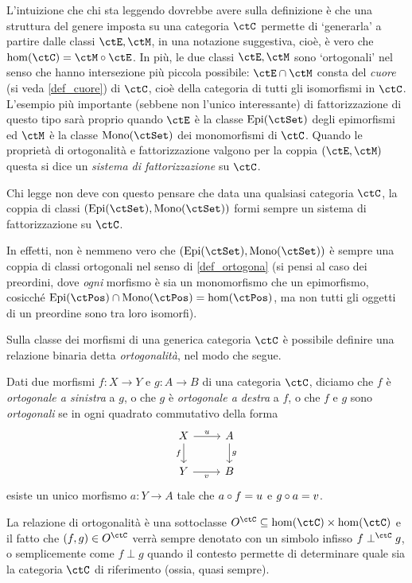L'intuizione che chi sta leggendo dovrebbe avere sulla definizione è che una struttura del genere imposta su una categoria \(\ctC\) permette di `generarla' a partire dalle classi \(\ctE,\ctM\), in una notazione suggestiva, cioè, è vero che \(\hom(\ctC) = \ctM\cmp \ctE\). In più, le due classi \(\ctE,\ctM\) sono `ortogonali' nel senso che hanno intersezione più piccola possibile: \(\ctE\cap \ctM\) consta del \emph{cuore} (si veda \ref{def_cuore}) di \(\ctC\), cioè della categoria di tutti gli isomorfismi in \(\ctC\).
\color{red}
L'esempio più importante (sebbene non l'unico interessante) di fattorizzazione di questo tipo sarà proprio quando \(\ctE\) è la classe \(\Epi\) degli epimorfismi ed \(\ctM\) è la classe \(\Mono\) dei monomorfismi di \(\ctC\). Quando le proprietà di ortogonalità e fattorizzazione valgono per la coppia \((\ctE,\ctM)\) questa si dice un \emph{sistema di fattorizzazione} su \(\ctC\).
\begin{remark}
	Chi legge non deve con questo pensare che data una qualsiasi categoria \(\ctC\), la coppia di classi \((\Epi,\Mono)\) formi sempre un sistema di fattorizzazione su \(\ctC\).

	In effetti, non è nemmeno vero che \((\Epi,\Mono)\) è sempre una coppia di classi ortogonali nel senso di \ref{def_ortogona} (si pensi al caso dei preordini, dove \emph{ogni} morfismo è sia un monomorfismo che un epimorfismo, cosicché \(\Epi[\ctPos]\cap\Mono[\ctPos]=\hom(\ctPos)\), ma non tutti gli oggetti di un preordine sono tra loro isomorfi).
\end{remark}
\color{black}
Sulla classe dei morfismi di una generica categoria \(\ctC\) è possibile definire una relazione binaria detta \emph{ortogonalità}, nel modo che segue.
\begin{definition}\label{def_ortogona}
	Dati due morfismi \(f : X\to Y\) e \(g : A\to B\) di una categoria \(\ctC\), diciamo che \(f\) è \emph{ortogonale a sinistra} a \(g\), o che \(g\) è \emph{ortogonale a destra} a \(f\), o che \(f\) e \(g\) sono \emph{ortogonali} se in ogni quadrato commutativo della forma
	\[
		\begin{tikzcd}
			X \ar[d, "f"']\ar[r, "u"]& A\ar[d, "g"] \\
			Y \ar[r, "v"']& B
		\end{tikzcd}
	\]
	esiste un unico morfismo \(a : Y\to A\) tale che \(a\circ f=u\) e \(g\circ a=v\).
\end{definition}
La relazione di ortogonalità è una sottoclasse \(O^\ctC \subseteq \hom(\ctC)\times\hom(\ctC)\) e il fatto che \((f,g)\in O^\ctC\) verrà sempre denotato con un simbolo infisso \(f\perp^\ctC g\), o semplicemente come \(f\perp g\) quando il contesto permette di determinare quale sia la categoria \(\ctC\) di riferimento (ossia, quasi sempre).

